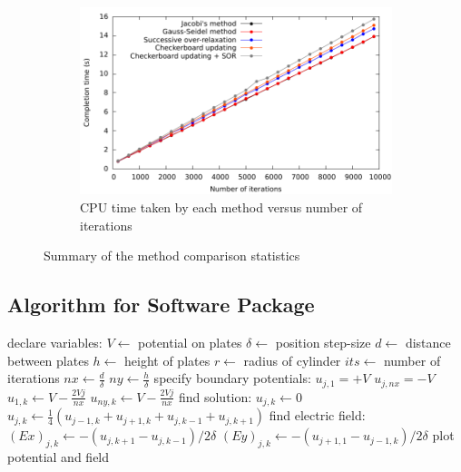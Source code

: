 \documentclass[11pt, a4paper]{article}
\begin{document}
\begin{figure}
\begin{subfigure}{0.8\textwidth}
	\includegraphics[scale=0.8]{time.pdf}
	\caption{CPU time taken by each method versus number of iterations}
	\label{fig:time}
\end{subfigure}
\caption{Summary of the method comparison statistics}
\label{fig:stats}
\end{figure}

\subsection{Algorithm for Software Package}

\begin{algorithm}
\begin{algorithmic}[1]
\State declare variables:
\State $V \gets$ potential on plates
\State $\delta \gets$ position step-size
\State $d \gets$ distance between plates
\State $h \gets$ height of plates
\State $r \gets$ radius of cylinder
\State $its \gets$ number of iterations
\State $nx \gets \frac{d}{\delta}$ 
\State $ny \gets \frac{h}{\delta}$ 
\State specify boundary potentials:
   \State $u_{j, 1} = +V$
   \State $u_{j, nx} = -V$
\EndFor
{}
   \State $u_{1, k} \gets V-\frac{2Vj}{nx}$
   \State $u_{ny, k} \gets V-\frac{2Vj}{nx}$
\EndFor
\State find solution:
            \State $u_{j, k} \gets 0$
         \Else
            \State $u_{j,k} \gets \frac{1}{4}(u_{j-1,k}+u_{j+1,k}+u_{j,k-1}+u_{j,k+1})$
         \EndIf
      \EndFor
   \EndFor
\EndFor
\State find electric field:
      \State $(Ex)_{j, k} \gets -\left(u_{j,k+1}-u_{j,k-1}\right)/2\delta$
      \State $(Ey)_{j,k} \gets -\left(u_{j+1,1}-u_{j-1,k}\right)/2\delta$
   \EndFor
\EndFor
\State plot potential and field
\EndProcedure
\end{algorithmic}
\end{algorithm}
\end{document}
